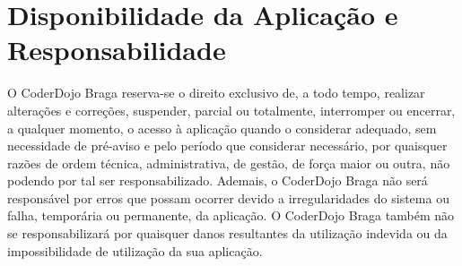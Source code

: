 \documentclass[11pt]{article}
\begin{document}
\section{Disponibilidade da Aplicação e Responsabilidade}

O CoderDojo Braga reserva-se o direito exclusivo de, a todo tempo, realizar
alterações e correções, suspender, parcial ou totalmente, interromper
ou encerrar, a qualquer momento, o acesso à aplicação quando o
considerar adequado, sem necessidade de pré-aviso e pelo período
que considerar necessário, por quaisquer razões de ordem técnica,
administrativa, de gestão, de força maior ou outra, não podendo por
tal ser responsabilizado.
Ademais, o CoderDojo Braga não será responsável por erros que possam
ocorrer devido a irregularidades do sistema ou falha, temporária ou
permanente, da aplicação. O CoderDojo Braga também não se
responsabilizará por quaisquer danos resultantes da utilização
indevida ou da impossibilidade de utilização da sua aplicação.
\end{document}
